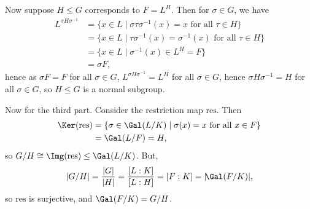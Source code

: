 \documentclass[12pt]{article}
\begin{document}
\begin{proofbox}
	Now suppose $H \le G$ corresponds to $F = L^H$. Then for $\sigma \in G$, we have
	\begin{align*}
		L^{\sigma H \sigma^{-1}} &= \{x \in L \mid \sigma \tau \sigma^{-1}(x) = x \text{ for all } \tau \in H\} \\
					 &= \{x \in L \mid \tau \sigma^{-1}(x) = \sigma^{-1}(x) \text{ for all } \tau \in H\} \\
					 &= \{x \in L \mid \sigma^{-1}(x) \in L^H = F\} \\
					 &= \sigma F,
	\end{align*}
	hence as $\sigma F = F$ for all $\sigma \in G$, $L^{\sigma H \sigma^{-1}} = L^{H}$ for all $\sigma \in G$, hence $\sigma H \sigma^{-1} = H$ for all $\sigma \in G$, so $H \le G$ is a normal subgroup.

	Now for the third part. Consider the restriction map $\mathrm{res}$. Then
	\begin{align*}
		\Ker(\mathrm{res}) &= \{\sigma \in \Gal(L/K) \mid \sigma(x) = x \text{ for all } x \in F\} \\
				   &= \Gal(L/F) = H,
	\end{align*}
	so $G/H \cong \Img(\mathrm{res}) \leq \Gal(L/K)$. But,
	\[
		|G/H| = \frac{|G|}{|H|} = \frac{[L:K]}{[L:H]} = [F:K]= |\!\Gal(F/K)|,
	\]
	so $\mathrm{res}$ is surjective, and $\Gal(F/K) = G/H$.
\end{proofbox}
\end{document}
